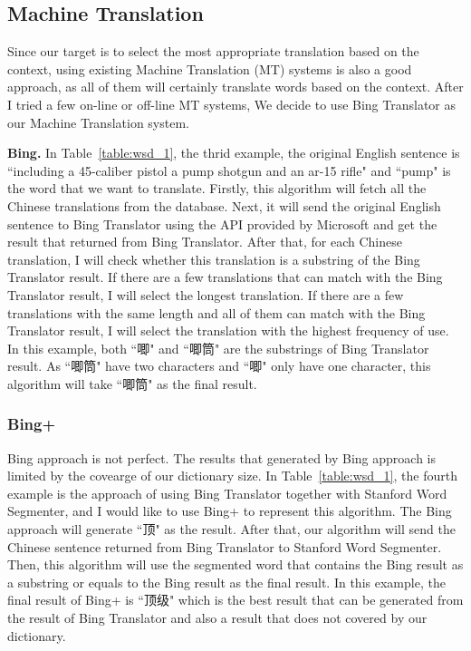 \begin{CJK}{UTF8}{gbsn}
\subsection{Machine Translation}
Since our target is to select the most appropriate translation based on the context, using existing Machine Translation (MT) systems is also a good approach, as all of them will certainly translate words based on the context. After I tried a few on-line or off-line MT systems, We decide to use Bing Translator as our Machine Translation system.

{\bf Bing.}
In Table~\ref{table:wsd_1}, the thrid example, the original English sentence is ``including a 45-caliber pistol a pump shotgun and an ar-15 rifle" and ``pump" is the word that we want to translate. Firstly, this algorithm will fetch all the Chinese translations from the database. Next, it will send the original English sentence to Bing Translator using the API provided by Microsoft and get the result that returned from Bing Translator. After that, for each Chinese translation, I will check whether this translation is a substring of the Bing Translator result. If there are a few translations that can match with the Bing Translator result, I will select the longest translation. If there are a few translations with the same length and all of them can match with the Bing Translator result, I will select the translation with the highest frequency of use. In this example, both ``唧" and ``唧筒" are the substrings of Bing Translator result. As ``唧筒" have two characters and ``唧" only have one character, this algorithm will take ``唧筒" as the final result.

\subsubsection{Bing+}
Bing approach is not perfect. The results that generated by Bing approach is limited by the covearge of our dictionary size. In Table~\ref{table:wsd_1}, the fourth example is the approach of using Bing Translator together with Stanford Word Segmenter, and I would like to use Bing+ to represent this algorithm. The Bing approach will generate ``顶" as the result. After that, our algorithm will send the Chinese sentence returned from Bing Translator to Stanford Word Segmenter. Then, this algorithm will use the segmented word that contains the Bing result as a substring or equals to the Bing result as the final result. In this example, the final result of Bing+ is ``顶级" which is the best result that can be generated from the result of Bing Translator and also a result that does not covered by our dictionary.


\end{CJK}
